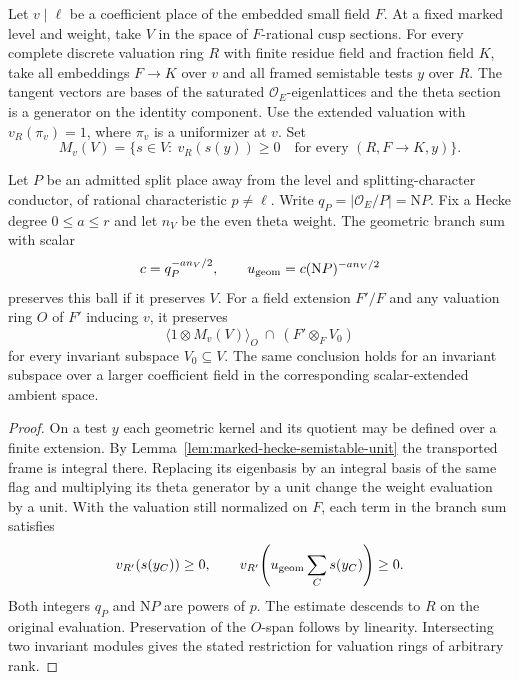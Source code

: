 \begin{auxlemma}
\label{lem:marked-semistable-local-ball}
Let \(v\mid\ell\) be a coefficient place of the embedded small field
\(F\). At a fixed marked level and weight, take \(V\) in the space of
\(F\)-rational cusp sections.
For every complete discrete valuation ring \(R\) with finite residue
field and fraction field \(K\), take all embeddings
\(F\to K\) over \(v\) and all framed semistable tests \(y\)
over \(R\). The tangent vectors are bases of the saturated
\(\mathcal O_E\)-eigenlattices and the theta section is a generator
on the identity component. Use the extended valuation with
\(v_R(\pi_v)=1\), where \(\pi_v\) is a uniformizer at \(v\). Set
\[
 M_v(V)=\{s\in V:\ v_R(s(y))\ge0\quad
                \text{for every }(R,F\to K,y)\}.
\]

Let \(P\) be an admitted split place away from the level and
splitting-character conductor, of rational characteristic \(p\ne\ell\).
Write \(q_P=|\mathcal O_E/P|=\mathrm NP\). Fix a Hecke degree
\(0\le a\le r\) and let \(n_V\) be the even theta weight.
The geometric branch sum with scalar
\[
 c=q_P^{-a n_V/2},\qquad u_{\rm geom}=c(\mathrm NP)^{-a n_V/2}
\]
preserves this ball if it preserves \(V\). For a field extension
\(F'/F\) and any valuation ring \(O\) of \(F'\) inducing \(v\), it
preserves
\[
  \langle1\otimes M_v(V)\rangle_O
       \ \cap\ (F'\otimes_F V_0)
\]
for every invariant subspace \(V_0\subseteq V\). The same conclusion
holds for an invariant subspace over a larger coefficient field in
the corresponding scalar-extended ambient space.
\end{auxlemma}
\begin{proof}
On a test \(y\) each geometric kernel and its quotient may be defined
over a finite extension. By Lemma~\ref{lem:marked-hecke-semistable-unit}
the transported frame is integral there. Replacing its eigenbasis by
an integral basis of the same flag and multiplying its theta generator
by a unit change the weight evaluation by a unit. With the valuation
still normalized on \(F\), each term in the branch sum satisfies
\[
    v_{R'}(s(y_C))\ge0,\qquad
    v_{R'}\!\left(u_{\rm geom}\sum_C s(y_C)\right)\ge0 .
\]
Both integers \(q_P\) and \(\mathrm NP\) are powers of \(p\).
The estimate descends to \(R\) on the original evaluation.
Preservation of the \(O\)-span follows by linearity. Intersecting
two invariant modules gives the stated restriction for valuation
rings of arbitrary rank.
\end{proof}

